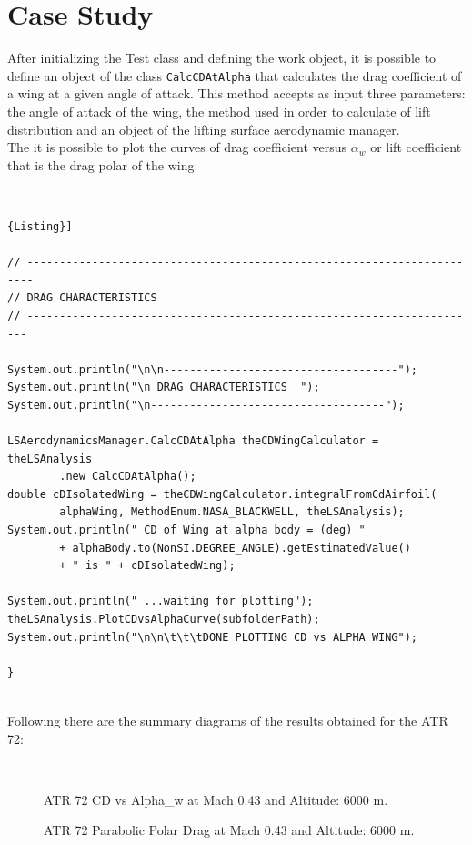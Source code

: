 \section{Case Study}

After initializing the Test class and defining the work object, it is possible to define an object of the class \texttt{CalcCDAtAlpha} that calculates the drag coefficient of a wing at a given angle of attack. This method accepts as input three parameters: the angle of attack of the wing,  the method used in order to calculate of lift distribution and an object of the lifting surface aerodynamic manager.\\
The it is possible to plot the curves of drag coefficient versus $\alpha_w$ or lift coefficient that is the drag polar of the wing.


\noindent \\
\begin{lstlisting}[frame=rbl,caption={{\footnotesize Use of Drag Calculator class}},label= [style=\bfseries]{Listing}]

// -----------------------------------------------------------------------
// DRAG CHARACTERISTICS 
// ----------------------------------------------------------------------

System.out.println("\n\n------------------------------------");
System.out.println("\n DRAG CHARACTERISTICS  ");
System.out.println("\n------------------------------------");

LSAerodynamicsManager.CalcCDAtAlpha theCDWingCalculator = theLSAnalysis
		.new CalcCDAtAlpha();
double cDIsolatedWing = theCDWingCalculator.integralFromCdAirfoil(
		alphaWing, MethodEnum.NASA_BLACKWELL, theLSAnalysis);
System.out.println(" CD of Wing at alpha body = (deg) "
		+ alphaBody.to(NonSI.DEGREE_ANGLE).getEstimatedValue()
		+ " is " + cDIsolatedWing);
	
System.out.println(" ...waiting for plotting");
theLSAnalysis.PlotCDvsAlphaCurve(subfolderPath);
System.out.println("\n\n\t\t\tDONE PLOTTING CD vs ALPHA WING");
			
}
\end{lstlisting}

\noindent \\

Following there are the summary diagrams of the results obtained for the ATR 72:

\noindent \\

\begin{figure}[H]
\centering

\caption{ATR 72 CD vs Alpha_w at Mach 0.43 and Altitude: 6000 m.}
\label{fig:DragATR}
\end{figure}


\begin{figure}[H]
\centering

\caption{ATR 72 Parabolic Polar Drag at Mach 0.43 and Altitude: 6000 m.}
\label{fig:DragATR}
\end{figure}



